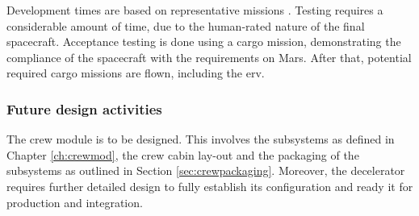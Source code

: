 Development times are based on representative missions \cite{Wertz2011}. Testing requires a considerable amount of time, due to the human-rated nature of the final spacecraft. Acceptance testing is done using a cargo mission, demonstrating the compliance of the spacecraft with the requirements on Mars. After that, potential required cargo missions are flown, including the \gls{erv}.

\subsubsection{Future design activities}
The crew module is to be designed. This involves the subsystems as defined in Chapter \ref{ch:crewmod}, the crew cabin lay-out and the packaging of the subsystems as outlined in Section \ref{sec:crewpackaging}. Moreover, the decelerator requires further detailed design to fully establish its configuration and ready it for production and integration. 

